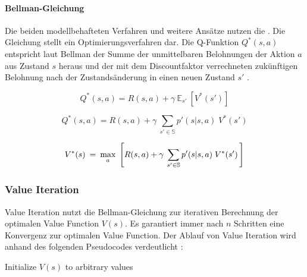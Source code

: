 \paragraph{Bellman-Gleichung}
Die beiden modellbehafteten Verfahren  und weitere Ansätze nutzen die  \cite{bellman}. Die Gleichung stellt ein Optimierungsverfahren dar.
Die Q-Funktion $Q^*(s,a)$ entspricht laut Bellman der Summe der unmittelbaren Belohnungen der Aktion $a$ aus Zustand $s$ heraus und der mit dem Discountfaktor verrechneten zukünftigen Belohnung nach der Zustandsänderung in einen neuen Zustand $s'$ \cite{alzantot} \cite{intro_to_ml_book} \cite{unity_blog_reinforcement_q} \cite{alzantot}.

$$   Q^* (s,a) = R(s,a) + \gamma  \:  \mathbb{E}_{s'}   \:   [V^*(s')]    $$

$$   Q^* (s,a) = R(s,a) + \gamma  \:  \sum_{s' \in{\mathbb{S}} } p'(s|s,a) \; V^*(s')    $$

$$   V^*(s)  \: = \:  \operatorname*{max}_a  \;  \left[   R(s,a) + \gamma  \:  \sum_{s' \in{\mathbb{S}} } p'(s|s,a) \; V^*(s')   \, \right] $$





\subsubsection{Value Iteration}
Value Iteration nutzt die Bellman-Gleichung zur iterativen Berechnung der optimalen Value Function $V(s)$. Es garantiert immer nach $n$ Schritten eine Konvergenz zur optimalen Value Function. Der Ablauf von Value Iteration wird anhand des folgenden Pseudocodes verdeutlicht \cite{intro_to_ml_book}:


\smallskip
\begin{algorithm}[H]
\SetAlgoLined
{}
\smallskip
Initialize $V(s)$ to arbitrary values\;
\caption{Value Iteration}
\end{algorithm}
\smallskip
\smallskip

